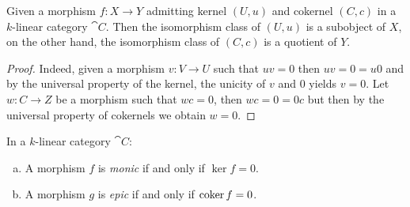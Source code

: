 \begin{corollary}
    \label{cor:k-linear-cat-kernel-is-subobject}
    Given a morphism \(f: X \to Y\) admitting kernel \((U, u)\) and cokernel
    \((C, c)\) in a \(k\)-linear category \(\cat C\). Then the isomorphism class of
    \((U, u)\) is a subobject of \(X\), on the other hand, the isomorphism class of
    \((C, c)\) is a quotient of \(Y\).
\end{corollary}

\begin{proof}
    Indeed, given a morphism \(v: V \to U\) such that \(u v = 0\) then \(u v = 0 = u
    0\) and by the universal property of the kernel, the unicity of \(v\) and \(0\)
    yields \(v = 0\). Let \(w: C \to Z\) be a morphism such that \(w c = 0\), then \(w
    c = 0 = 0 c\) but then by the universal property of cokernels we obtain \(w = 0\).
\end{proof}

\begin{lemma}
    \label{lem:k-linear-cat-monic-epic-iff-ker-coker-zero}
    In a \(k\)-linear category \(\cat C\):
    \begin{enumerate}[(a)]\setlength\itemsep{0em}
        \item A morphism \(f\) is \emph{monic} if and only if \(\ker f = 0\).
        \item A morphism \(g\) is \emph{epic} if and only if \(\operatorname{coker} f = 0\).
    \end{enumerate}
\end{lemma}

